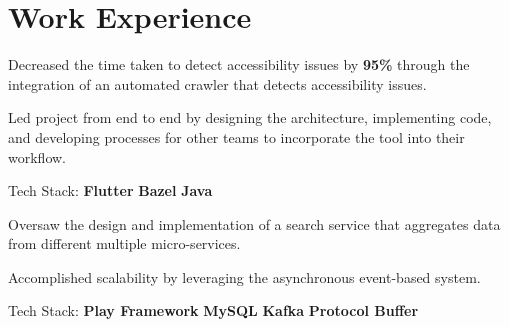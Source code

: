 \documentclass[]{Klement_Resume}
\begin{document}
%
%

%
%


\begin{minipage}[t]{0.66\textwidth} 


\section{Work Experience}

\vspace{\topsep} %
\begin{tightemize}
\item Decreased the time taken to detect accessibility issues by {\bf 95\%} through the integration of an automated crawler that detects accessibility issues.
\item Led project from end to end by designing the architecture, implementing code, and developing processes for other teams to incorporate the tool into their workflow.
\item Tech Stack: {\bf Flutter} \textbullet{} {\bf Bazel} \textbullet{} {\bf Java}
\end{tightemize}
\sectionsep


\begin{tightemize}
\item Oversaw the design and implementation of a search service that aggregates data from different multiple micro-services.
\item Accomplished scalability by leveraging the asynchronous event-based system.
\item Tech Stack: {\bf Play Framework} \textbullet{} {\bf MySQL} \textbullet{} {\bf Kafka} \textbullet{} {\bf Protocol Buffer} 
\end{tightemize}
\sectionsep


\end{minipage}
\end{document}
